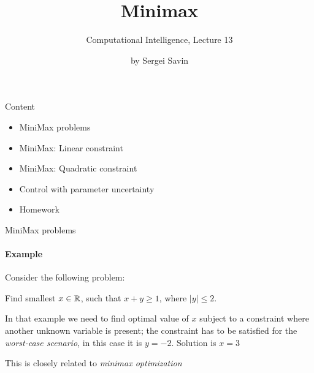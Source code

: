 \documentclass{beamer}
\title{ Minimax }
\subtitle{Computational Intelligence, Lecture 13}
\author{by Sergei Savin}
\date{\mydate}
\begin{document}
\maketitle



\begin{frame}{Content}

\begin{itemize}
 \item MiniMax problems
 \item MiniMax: Linear constraint
 \item MiniMax: Quadratic constraint
 \item Control with parameter uncertainty
\item Homework
\end{itemize}

\end{frame}



\begin{frame}{MiniMax problems}
\framesubtitle{Example}
\begin{flushleft}

Consider the following problem: 

\begin{example}
Find smallest $x \in \mathbb{R}$, such that $x + y \geq 1$, where $|y| \leq 2$.
\end{example}

\bigskip

In that example we need to find optimal value of $x$ subject to a constraint where another unknown variable is present; the constraint has to be satisfied for the \emph{worst-case scenario}, in this case it is $y = -2$. Solution is $x = 3$

\bigskip

This is closely related to \emph{minimax optimization}
 
\end{flushleft}
\end{frame}
\end{document}
